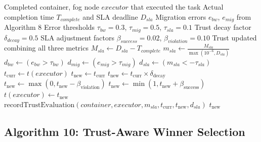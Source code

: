 \documentclass[12pt,a4paper]{article}
\begin{document}
\begin{algorithm}[H]
\caption{Update Trust After Task Completion}
\begin{algorithmic}[1]
\Require Completed container, fog node $executor$ that executed the task
\Require Actual completion time $T_{complete}$ and SLA deadline $D_{sla}$
\Require Migration errors $e_{bw}$, $e_{mig}$ from Algorithm 8
\Require Error thresholds $\tau_{bw} = 0.3$, $\tau_{mig} = 0.5$, $\tau_{sla} = 0.1$
\Require Trust decay factor $\delta_{decay} = 0.5$
\Require SLA adjustment factors $\beta_{success} = 0.02$, $\beta_{violation} = 0.10$
\Ensure Trust updated combining all three metrics
\State {}
\State $M_{sla} \gets D_{sla} - T_{complete}$
\State $m_{sla} \gets \frac{M_{sla}}{\max(10^{-6}, D_{sla})}$ 
\State
\State {}
\State $d_{bw} \gets (e_{bw} > \tau_{bw})$
\State $d_{mig} \gets (e_{mig} > \tau_{mig})$
\State $d_{sla} \gets (m_{sla} < -\tau_{sla})$ 
\State
\State {}
\State $t_{\text{curr}} \gets t(executor)$
\State $t_{\text{new}} \gets t_{\text{curr}}$
\State
\State {}
    \State $t_{\text{new}} \gets t_{\text{curr}} \times \delta_{\text{decay}}$ 
\EndIf
\State
\State {}
    \State $t_{\text{new}} \gets \max(0, t_{\text{new}} - \beta_{\text{violation}})$ 
    \State $t_{\text{new}} \gets \min(1, t_{\text{new}} + \beta_{\text{success}})$ 
\EndIf
\State
\State {}
\State $t(executor) \gets t_{\text{new}}$
\State
\State {}
\State $\text{recordTrustEvaluation}(container, executor, m_{sla}, t_{\text{curr}}, t_{\text{new}}, d_{sla})$
\State \Return $t_{\text{new}}$
\end{algorithmic}
\end{algorithm}

\subsection{Algorithm 10: Trust-Aware Winner Selection}
\end{document}
